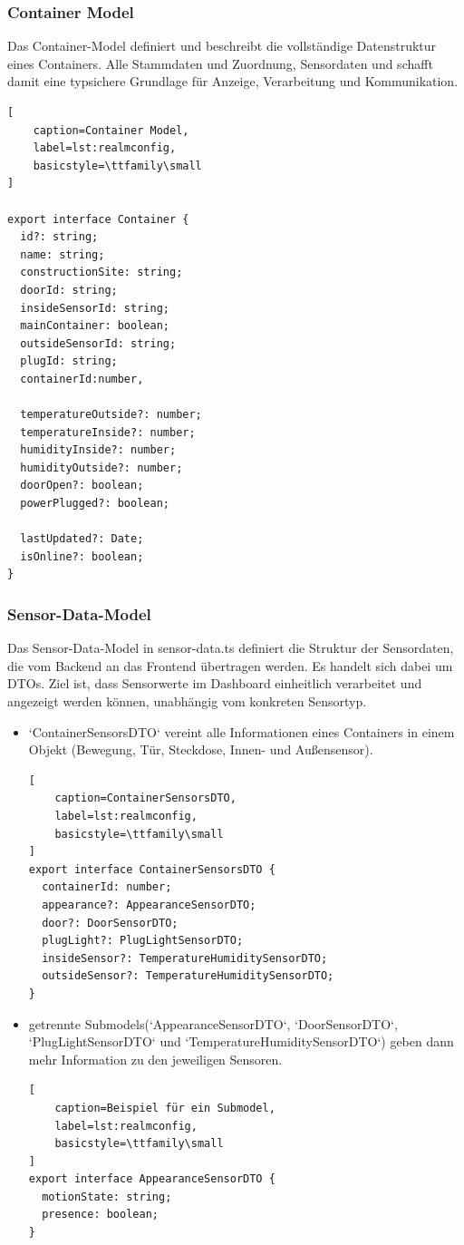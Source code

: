 \subsubsection{Container Model}
Das Container-Model definiert und beschreibt die vollständige Datenstruktur eines Containers. Alle Stammdaten und Zuordnung, Sensordaten und schafft damit eine typsichere Grundlage für Anzeige, Verarbeitung und Kommunikation.

\begin{lstlisting}[
    caption=Container Model,
    label=lst:realmconfig,
    basicstyle=\ttfamily\small
]

export interface Container {
  id?: string; 
  name: string;
  constructionSite: string;
  doorId: string;
  insideSensorId: string;
  mainContainer: boolean; 
  outsideSensorId: string;
  plugId: string;
  containerId:number,
  
  temperatureOutside?: number;
  temperatureInside?: number; 
  humidityInside?: number;    
  humidityOutside?: number;   
  doorOpen?: boolean;         
  powerPlugged?: boolean;     
  
  lastUpdated?: Date;         
  isOnline?: boolean;         
}

\end{lstlisting}

\subsubsection{Sensor-Data-Model}
Das Sensor-Data-Model in sensor-data.ts definiert die Struktur der Sensordaten, die vom Backend an das Frontend übertragen werden. Es handelt sich dabei um DTOs. Ziel ist, dass Sensorwerte im Dashboard einheitlich verarbeitet und angezeigt werden können, unabhängig vom konkreten Sensortyp.

\begin{itemize}
\item `ContainerSensorsDTO` vereint alle Informationen eines Containers in einem Objekt (Bewegung, Tür, Steckdose, Innen- und Außensensor).
\begin{lstlisting}[
    caption=ContainerSensorsDTO,
    label=lst:realmconfig,
    basicstyle=\ttfamily\small
]
export interface ContainerSensorsDTO {
  containerId: number;
  appearance?: AppearanceSensorDTO;
  door?: DoorSensorDTO;
  plugLight?: PlugLightSensorDTO;
  insideSensor?: TemperatureHumiditySensorDTO;
  outsideSensor?: TemperatureHumiditySensorDTO;
}
\end{lstlisting}
\item getrennte Submodels(`AppearanceSensorDTO`, `DoorSensorDTO`, `PlugLightSensorDTO` und `TemperatureHumiditySensorDTO`) geben dann mehr Information zu den jeweiligen Sensoren.
\begin{lstlisting}[
    caption=Beispiel für ein Submodel,
    label=lst:realmconfig,
    basicstyle=\ttfamily\small
]
export interface AppearanceSensorDTO {
  motionState: string;
  presence: boolean;
}
\end{lstlisting}

\end{itemize}



